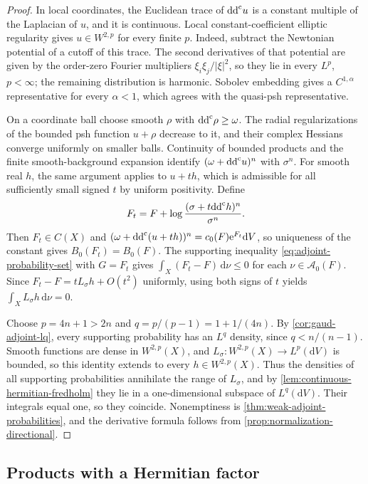 \begin{proof}
In local coordinates, the Euclidean trace of $\mathrm{dd}^{\mathrm{c}} u$ is a constant
multiple of the Laplacian of $u$, and it is continuous. Local
constant-coefficient elliptic regularity gives $u\in W^{2,p}$ for every
finite $p$. Indeed, subtract the Newtonian potential of a cutoff of this
trace. The second derivatives of that potential are given by the
order-zero Fourier multipliers $\xi_i\xi_j/|\xi|^2$, so they lie in every
$L^p$, $p<\infty$; the remaining distribution is harmonic. Sobolev
embedding gives a $C^{1,\alpha}$ representative for every $\alpha<1$,
which agrees with the quasi-psh representative.

On a coordinate ball choose smooth $\rho$ with $\mathrm{dd}^{\mathrm{c}}\rho\geq\omega$.
The radial regularizations of the bounded psh function $u+\rho$ decrease
to it, and their complex Hessians converge uniformly on smaller balls.
Continuity of bounded products and the finite smooth-background
expansion identify $(\omega+\mathrm{dd}^{\mathrm{c}} u)^n$ with $\sigma^n$. For smooth real
$h$, the same argument applies to $u+th$, which is admissible for all
sufficiently small signed $t$ by uniform positivity. Define
\[
 F_t=F+\log\frac{(\sigma+t\mathrm{dd}^{\mathrm{c}} h)^n}{\sigma^n}.
\]
Then $F_t\in C(X)$ and
$(\omega+\mathrm{dd}^{\mathrm{c}}(u+th))^n=c_0(F)\mathrm e^{F_t}\mathrm dV$, so uniqueness of
the constant gives $B_0(F_t)=B_0(F)$. The supporting inequality
\eqref{eq:adjoint-probability-set} with $G=F_t$ gives
$\int_X(F_t-F)\,\mathrm d\nu\leq0$ for each
$\nu\in\mathcal A_0(F)$. Since
$F_t-F=tL_\sigma h+O(t^2)$ uniformly, using both signs of $t$ yields
$\int_XL_\sigma h\,\mathrm d\nu=0$.

Choose $p=4n+1>2n$ and $q=p/(p-1)=1+1/(4n)$. By
\cref{cor:gaud-adjoint-lq}, every supporting probability has an $L^q$
density, since $q<n/(n-1)$. Smooth functions are dense in $W^{2,p}(X)$,
and $L_\sigma\colon W^{2,p}(X)\to L^p(\mathrm dV)$ is bounded, so this
identity extends to every $h\in W^{2,p}(X)$. Thus the densities of all
supporting probabilities annihilate the range of $L_\sigma$, and by
\cref{lem:continuous-hermitian-fredholm} they lie in a one-dimensional
subspace of $L^q(\mathrm dV)$. Their integrals equal one, so they coincide.
Nonemptiness is \cref{thm:weak-adjoint-probabilities}, and the derivative
formula follows from \cref{prop:normalization-directional}.
\end{proof}

\subsection{Products with a Hermitian factor}

